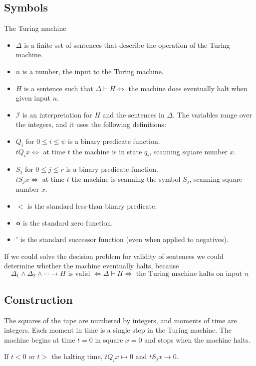 \subsection{Symbols}
The Turing machine 

\begin{itemize}
\item $\Delta$ is a finite set of sentences that describe the operation of the Turing machine.
\item $n$ is a number, the input to the Turing machine.
\item $H$ is a sentence such that $\Delta\vdash H\iff$ the machine does eventually halt when given input $n$.
\item $\mathscr{I}$ is an interpretation for $H$ and the sentences in $\Delta$. The variables range over the integers, and it uses the following definitions:
\item $Q_i$ for $0 \le i \le \psi$ is a binary predicate function.\\
$t Q_i x \iff $ at time $t$ the machine is in state $q_i$, scanning square number $x$.
\item $S_j$ for $0\le j\le r$ is a binary predicate function.\\
$t S_j x \iff $ at time $t$ the machine is scanning the symbol $S_j$, scanning square number $x$.
\item $<$ is the standard less-than binary predicate.
\item $\mathbf{o}$ is the standard zero function.
\item $'$ is the standard successor function (even when applied to negatives).
\end{itemize}

If we could solve the decision problem for validity of sentences we could determine whether the machine eventually halts, because 
\[\Delta_1 \land  \Delta_2 \land  \cdots \rightarrow H\text{ is valid }\iff \Delta\vdash H \iff \text{ the Turing machine halts on input }n\]

\subsection{Construction}
The squares of the tape are numbered by integers, and moments of time are integers. Each moment in time is a single step in the Turing machine. The machine begins at time $t=0$ in square $x=0$ and stops when the machine halts. 

If $t<0$ or $t>$ the halting time, $tQ_ix \mapsto 0$ and $tS_jx\mapsto 0$.

